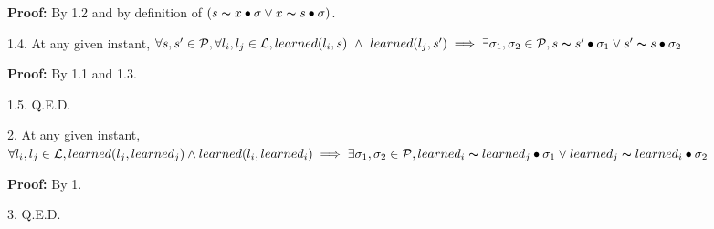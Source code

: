 \indent\indent\indent\indent\parbox{\linewidth}{\strut\textbf{Proof:} By 1.2 and by definition of $(s \thicksim x \bullet \sigma \lor x \thicksim s \bullet \sigma)$.}\par
\indent\indent\indent\parbox{\linewidth-\algorithmicindent*3}{\strut1.4. At any given instant, $\forall s,s' \in \mathcal{P}, \forall l_i,l_j \in \mathcal{L}, learned(l_i,s)\ \land\ learned(l_j,s') \implies \exists \sigma_1,\sigma_2 \in \mathcal{P}, s \thicksim s' \bullet \sigma_1 \lor s' \thicksim s \bullet \sigma_2$ }\par
\indent\indent\indent\indent\parbox{\linewidth}{\strut\textbf{Proof:} By 1.1 and 1.3.}\par
\indent\indent\indent\parbox{\linewidth}{\strut1.5. Q.E.D. }\par
\parbox{\linewidth-\algorithmicindent*3}{\strut2. At any given instant, $\forall l_i,l_j \in \mathcal{L}, learned(l_j,learned_j) \land learned(l_i,learned_i) \implies \exists \sigma_1,\sigma_2 \in \mathcal{P}, learned_i \thicksim learned_j \bullet \sigma_1 \lor learned_j \thicksim learned_i \bullet \sigma_2$}\par
\indent\indent\parbox{\linewidth}{\strut\textbf{Proof:} By 1.}\par
\parbox{\linewidth}{\strut3. Q.E.D.} \par

